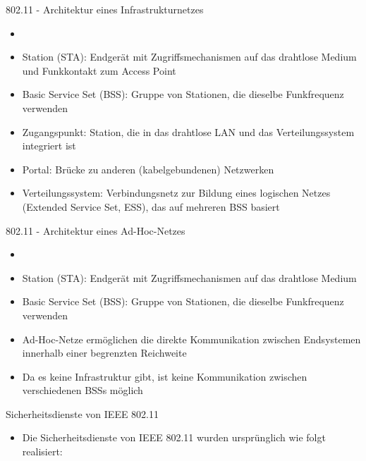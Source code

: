 \documentclass[a4paper]{article}
\begin{document}
\begin{multicols}{3}
    802.11 - Architektur eines Infrastrukturnetzes

    \begin{itemize}
        \item
        \item
              Station (STA): Endgerät mit Zugriffsmechanismen auf das drahtlose
              Medium und Funkkontakt zum Access Point
        \item
              Basic Service Set (BSS): Gruppe von Stationen, die dieselbe
              Funkfrequenz verwenden
        \item
              Zugangspunkt: Station, die in das drahtlose LAN und das
              Verteilungssystem integriert ist
        \item
              Portal: Brücke zu anderen (kabelgebundenen) Netzwerken
        \item
              Verteilungssystem: Verbindungsnetz zur Bildung eines logischen Netzes
              (Extended Service Set, ESS), das auf mehreren BSS basiert
    \end{itemize}

    802.11 - Architektur eines Ad-Hoc-Netzes

    \begin{itemize}
        \item
        \item
              Station (STA): Endgerät mit Zugriffsmechanismen auf das drahtlose
              Medium
        \item
              Basic Service Set (BSS): Gruppe von Stationen, die dieselbe
              Funkfrequenz verwenden
        \item
              Ad-Hoc-Netze ermöglichen die direkte Kommunikation zwischen
              Endsystemen innerhalb einer begrenzten Reichweite
        \item
              Da es keine Infrastruktur gibt, ist keine Kommunikation zwischen
              verschiedenen BSSs möglich
    \end{itemize}

    Sicherheitsdienste von IEEE 802.11

    \begin{itemize}
        \item
              Die Sicherheitsdienste von IEEE 802.11 wurden ursprünglich wie folgt
              realisiert:


\end{itemize}
\end{multicols}
\end{document}
